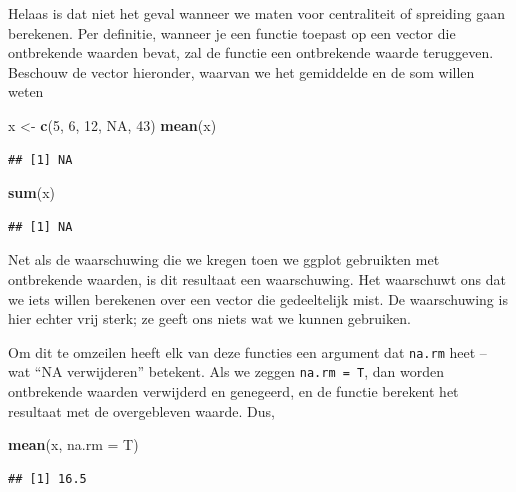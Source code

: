 \documentclass[]{tufte-book}
\newenvironment{Shaded}{}{}
\newcommand{\DataTypeTok}[1]{\textcolor[rgb]{0.56,0.13,0.00}{#1}}
\newcommand{\DecValTok}[1]{\textcolor[rgb]{0.25,0.63,0.44}{#1}}
\newcommand{\KeywordTok}[1]{\textcolor[rgb]{0.00,0.44,0.13}{\textbf{#1}}}
\newcommand{\NormalTok}[1]{#1}
\newcommand{\OtherTok}[1]{\textcolor[rgb]{0.00,0.44,0.13}{#1}}
\newcommand{\StringTok}[1]{\textcolor[rgb]{0.25,0.44,0.63}{#1}}
\begin{document}
Helaas is dat niet het geval wanneer we maten voor centraliteit of spreiding gaan berekenen. Per definitie, wanneer je een functie toepast op een vector die ontbrekende waarden bevat, zal de functie een ontbrekende waarde teruggeven. Beschouw de vector hieronder, waarvan we het gemiddelde en de som willen weten

\begin{Shaded}
\begin{Highlighting}[]
\NormalTok{x <-}\StringTok{ }\KeywordTok{c}\NormalTok{(}\DecValTok{5}\NormalTok{, }\DecValTok{6}\NormalTok{, }\DecValTok{12}\NormalTok{, }\OtherTok{NA}\NormalTok{, }\DecValTok{43}\NormalTok{)}
\KeywordTok{mean}\NormalTok{(x)}
\end{Highlighting}
\end{Shaded}

\begin{verbatim}
## [1] NA
\end{verbatim}

\begin{Shaded}
\begin{Highlighting}[]
\KeywordTok{sum}\NormalTok{(x)}
\end{Highlighting}
\end{Shaded}

\begin{verbatim}
## [1] NA
\end{verbatim}

Net als de waarschuwing die we kregen toen we ggplot gebruikten met ontbrekende waarden, is dit resultaat een waarschuwing. Het waarschuwt ons dat we iets willen berekenen over een vector die gedeeltelijk mist. De waarschuwing is hier echter vrij sterk; ze geeft ons niets wat we kunnen gebruiken.

Om dit te omzeilen heeft elk van deze functies een argument dat \texttt{na.rm} heet -- wat ``NA verwijderen'' betekent. Als we zeggen \texttt{na.rm\ =\ T}, dan worden ontbrekende waarden verwijderd en genegeerd, en de functie berekent het resultaat met de overgebleven waarde. Dus,

\begin{Shaded}
\begin{Highlighting}[]
\KeywordTok{mean}\NormalTok{(x, }\DataTypeTok{na.rm =}\NormalTok{ T)}
\end{Highlighting}
\end{Shaded}

\begin{verbatim}
## [1] 16.5
\end{verbatim}
\end{document}
